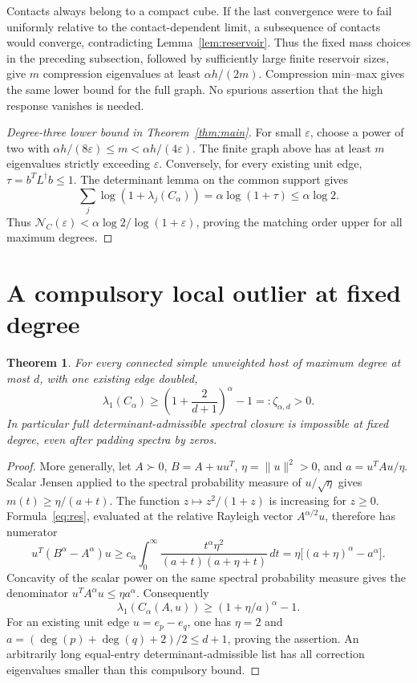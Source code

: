 \documentclass[11pt]{article}
\newtheorem{theorem}{Theorem}[section]
\newcommand{\N}{\mathcal N}
\begin{document}
Contacts always belong to a compact cube. If the last convergence
were to fail uniformly relative to the contact-dependent limit, a
subsequence of contacts would converge, contradicting
Lemma~\ref{lem:reservoir}. Thus the fixed mass choices in the preceding
subsection, followed by sufficiently large finite reservoir sizes,
give $m$ compression eigenvalues at least $\alpha h/(2m)$.
Compression min--max gives the same lower bound for the full graph.
No spurious assertion that the high response vanishes is needed.

\begin{proof}[Degree-three lower bound in Theorem~\ref{thm:main}]
For small $\varepsilon$, choose a power of two with
$\alpha h/(8\varepsilon)\le m<\alpha h/(4\varepsilon)$.
The finite graph above has at least $m$ eigenvalues strictly exceeding
$\varepsilon$.
Conversely, for every existing unit edge, $\tau=b^TL^\dagger b\le1$.
The determinant lemma on the common support gives
\[
 \sum_j\log(1+\lambda_j(C_\alpha))=\alpha\log(1+\tau)\le\alpha\log2.
\]
Thus $\N_C(\varepsilon)<\alpha\log2/\log(1+\varepsilon)$, proving
the matching order upper for all maximum degrees.
\end{proof}

\section{A compulsory local outlier at fixed degree}
\begin{theorem}\label{thm:outlier}
For every connected simple unweighted host of maximum degree at most
$d$, with one existing edge doubled,
\[
 \lambda_1(C_\alpha)\ge
             \left(1+\frac{2}{d+1}\right)^\alpha-1=:\zeta_{\alpha,d}>0.
\]
In particular full determinant-admissible spectral closure is impossible
at fixed degree, even after padding spectra by zeros.
\end{theorem}
\begin{proof}
More generally, let $A\succ0$, $B=A+uu^T$, $\eta=\|u\|^2>0$,
and $a=u^TAu/\eta$. Scalar Jensen applied to the spectral probability
measure of $u/\sqrt\eta$ gives $m(t)\ge\eta/(a+t)$.
The function $z\mapsto z^2/(1+z)$ is increasing for $z\ge0$.
Formula~\eqref{eq:res}, evaluated at the relative Rayleigh vector
$A^{\alpha/2}u$, therefore has numerator
\[
 u^T(B^\alpha-A^\alpha)u
 \ge c_\alpha\int_0^\infty
          \frac{t^\alpha\eta^2}{(a+t)(a+\eta+t)}\,dt
 =\eta\bigl[(a+\eta)^\alpha-a^\alpha\bigr].
\]
Concavity of the scalar power on the same spectral probability measure
gives the denominator $u^TA^\alpha u\le\eta a^\alpha$. Consequently
\[
 \lambda_1(C_\alpha(A,u))\ge(1+\eta/a)^\alpha-1.
\]
For an existing unit edge $u=e_p-e_q$, one has $\eta=2$ and
$a=(\deg(p)+\deg(q)+2)/2\le d+1$, proving the assertion.
An arbitrarily long equal-entry determinant-admissible list has all
correction eigenvalues smaller than this compulsory bound.
\end{proof}
\end{document}
